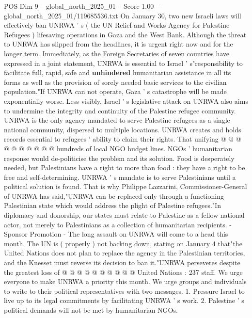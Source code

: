 \begin{textsample}{POS Dim 9 – global\_north\_2025\_01 – Score 1.00 – global\_north\_2025\_01/119685536.txt}  \label{ex:f9_pos_360}
On January 30, two new Israeli laws will effectively ban UNRWA ' s ( the UN Relief and Works Agency for Palestine Refugees ) lifesaving operations in Gaza and the West Bank.
Although the threat to UNRWA has slipped from the headlines, it is urgent right now and for the longer term.
Immediately, as the Foreign Secretaries of seven countries have expressed in a joint statement, UNRWA is essential to Israel ' s"responsibility to facilitate full, rapid, safe and \textbf{unhindered} humanitarian assistance in all its forms as well as the provision of sorely needed basic services to the civilian population."If UNRWA can not operate, Gaza ' s catastrophe will be made exponentially worse.
Less visibly, Israel ' s legislative attack on UNRWA also aims to undermine the integrity and continuity of the Palestine refugee community.
UNRWA is the only agency mandated to serve Palestine refugees as a single national community, dispersed to multiple locations.
UNRWA creates and holds records essential to refugees ' ability to claim their rights.
That unifying @ @ @ @ @ @ @ @ @ @ hundreds of local NGO budget lines.
NGOs ' humanitarian response would de-politicise the problem and its solution.
Food is desperately needed, but Palestinians have a right to more than food : they have a right to be free and self-determining.
UNRWA ' s mandate is to serve Palestinians until a political solution is found.
That is why Philippe Lazzarini, Commissioner-General of UNRWA has said,"UNRWA can be replaced only through a functioning Palestinian state which would address the plight of Palestine refugees."In diplomacy and donorship, our states must relate to Palestine as a fellow national actor, not merely to Palestinians as a collection of humanitarian recipients. - Sponsor Promotion - The long assault on UNRWA will come to a head this month.
The UN is ( properly ) not backing down, stating on January 4 that"the United Nations does not plan to replace the agency in the Palestinian territories, and the Knesset must reverse its decision to ban it."UNRWA perseveres despite the greatest loss of @ @ @ @ @ @ @ @ @ @ United Nations : 237 staff.
We urge everyone to make UNRWA a priority this month.
We urge groups and individuals to write to their political representatives with two messages. 1.
Pressure Israel to live up to its legal commitments by facilitating UNRWA ' s work. 2.
Palestine ' s political demands will not be met by humanitarian NGOs.

\end{textsample}

